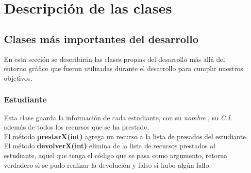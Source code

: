 \documentclass[12pt]{article}
\begin{document}
\section{Descripción de las clases}
\subsection{Clases más importantes del desarrollo}
En esta sección se describirán las clases propias del desarrollo más allá del entorno gráfico que fueron utilizadas durante el desarrollo para cumplir nuestros objetivos.
\subsubsection{Estudiante}
\begin{center}

\end{center}
Esta clase guarda la información de cada estudiante, con su \textit{nombre} , su \textit{C.I.}  además de todos los recursos que se ha prestado.  \\ 
El método \textbf{prestarX(int)} agrega un recurso a la lista de presados del estudiante.  El método \textbf{devolverX(int)} elimina de la lista de recursos prestados al estudiante, aquel que tenga el código que se pasa como argumento, retorna verdadero si se pudo realizar la devolución y falso si hubo algún fallo.  
\end{document}
